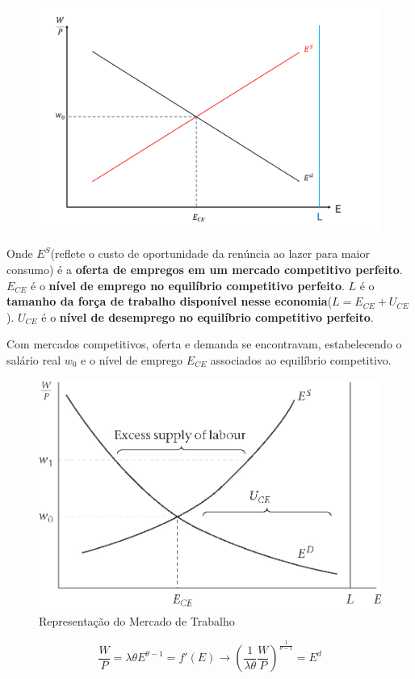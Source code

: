 \documentclass[a4paper,12pt]{article}[abntex2]
\begin{document}
\begin{figure}[H]
    \centering
    \includegraphics[width=0.7\linewidth]{Imagens/a5i6.png}
\end{figure}

Onde \(E^S\)(reflete o custo de oportunidade da renúncia ao lazer para maior consumo) é a \textbf{oferta de empregos em um mercado competitivo perfeito}. \(E_{CE}\) é o \textbf{nível de emprego no equilíbrio competitivo perfeito}. \(L\) é o \textbf{tamanho da força de trabalho disponível nesse economia}(\(L=E_{CE}+U_{CE}\)). \(U_{CE}\) é o \textbf{nível de desemprego no equilíbrio competitivo perfeito}.

Com mercados competitivos, oferta e demanda se encontravam, estabelecendo o salário real \(w_0\) e o nível de emprego \(E_{CE}\) associados ao equilíbrio competitivo.

\begin{figure}[H]
    \centering
    \caption{Representação do Mercado de Trabalho}
    \includegraphics[width=0.7\linewidth]{Imagens/a5i1.png}
\end{figure}

\[
\frac{W}{P}=\lambda\theta E^{\theta-1}=f'(E)\rightarrow (\frac{1}{\lambda\theta}\frac{W}{P})^{\frac{1}{\theta-1}}=E^d
\]
\end{document}
